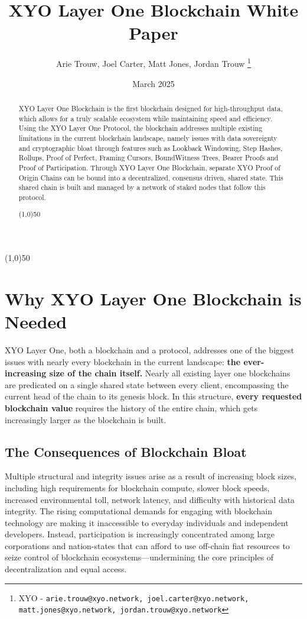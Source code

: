 \documentclass{article}
\title {XYO Layer One Blockchain White Paper}
\author{
    Arie Trouw,
    Joel Carter,
    Matt Jones,
    Jordan Trouw
    \thanks{XYO - \texttt{arie.trouw@xyo.network, joel.carter@xyo.network, matt.jones@xyo.network, jordan.trouw@xyo.network}}
}
\date{March 2025}
\begin{document}
\maketitle

\begin{center}
    \line(1,0){50}
\end{center}

\begin{abstract}
    XYO Layer One Blockchain is the first blockchain designed for high-throughput data, which allows for a truly scalable ecosystem while maintaining speed and efficiency. Using the XYO Layer One Protocol, the blockchain addresses multiple existing limitations in the current blockchain landscape, namely issues with data sovereignty and cryptographic bloat through features such as Lookback Windowing, Step Hashes, Rollups, Proof of Perfect, Framing Cursors, BoundWitness Trees, Bearer Proofs and Proof of Participation. Through XYO Layer One Blockchain, separate XYO Proof of Origin Chains can be bound into a decentralized, consensus driven, shared state. This shared chain is built and managed by a network of staked nodes that follow this protocol.
    \begin{center}
        \line(1,0){50}
    \end{center}
\end{abstract}

\section{Why XYO Layer One Blockchain is Needed}
XYO Layer One, both a blockchain and a protocol, addresses one of the biggest
issues with nearly every blockchain in the current landscape: \textbf{the
    ever-increasing size of the chain itself.} Nearly all existing layer one
blockchains are predicated on a single shared state between every client,
encompassing the current head of the chain to its genesis block. In this
structure, \textbf{every requested blockchain value} requires the history of
the entire chain, which gets increasingly larger as the blockchain is built.

\subsection{The Consequences of Blockchain Bloat}
Multiple structural and integrity issues arise as a result of increasing block
sizes, including high requirements for blockchain compute, slower block speeds,
increased environmental toll, network latency, and difficulty with historical
data integrity. The rising computational demands for engaging with blockchain
technology are making it inaccessible to everyday individuals and independent
developers. Instead, participation is increasingly concentrated among large
corporations and nation-states that can afford to use off-chain fiat resources
to seize control of blockchain ecosystems—undermining the core principles of
decentralization and equal access.
\end{document}
